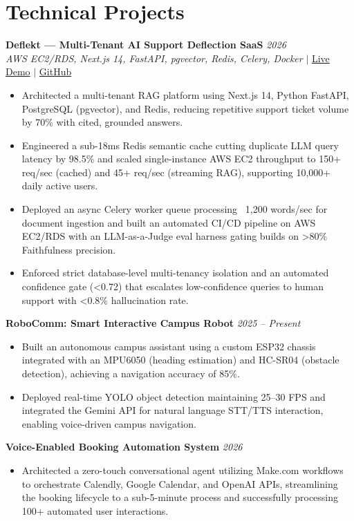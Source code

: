 \documentclass[11pt, a4paper]{article}
\begin{document}
\section*{Technical Projects}

\textbf{Deflekt — Multi-Tenant AI Support Deflection SaaS} \hfill \textit{2026} \\
\textit{AWS EC2/RDS, Next.js 14, FastAPI, pgvector, Redis, Celery, Docker} $|$ \href{http://54.208.178.218/}{Live Demo} $|$ \href{https://github.com/SShayanHussain/deflekt}{GitHub}
\begin{itemize}[leftmargin=0.25in, itemsep=2pt]
    \item Architected a multi-tenant RAG platform using Next.js 14, Python FastAPI, PostgreSQL (pgvector), and Redis, reducing repetitive support ticket volume by 70\% with cited, grounded answers.
    \item Engineered a sub-18ms Redis semantic cache cutting duplicate LLM query latency by 98.5\% and scaled single-instance AWS EC2 throughput to 150+ req/sec (cached) and 45+ req/sec (streaming RAG), supporting 10,000+ daily active users.
    \item Deployed an async Celery worker queue processing ~1,200 words/sec for document ingestion and built an automated CI/CD pipeline on AWS EC2/RDS with an LLM-as-a-Judge eval harness gating builds on >80\% Faithfulness precision.
    \item Enforced strict database-level multi-tenancy isolation and an automated confidence gate (<0.72) that escalates low-confidence queries to human support with <0.8\% hallucination rate.
\end{itemize}

\textbf{RoboComm: Smart Interactive Campus Robot} \hfill \textit{2025 -- Present}
\begin{itemize}[leftmargin=0.25in, itemsep=2pt]
    \item Built an autonomous campus assistant using a custom ESP32 chassis integrated with an MPU6050 (heading estimation) and HC-SR04 (obstacle detection), achieving a navigation accuracy of 85\%.
    \item Deployed real-time YOLO object detection maintaining 25--30 FPS and integrated the Gemini API for natural language STT/TTS interaction, enabling voice-driven campus navigation.
\end{itemize}

\textbf{Voice-Enabled Booking Automation System} \hfill \textit{2026}
\begin{itemize}[leftmargin=0.25in, itemsep=2pt]
    \item Architected a zero-touch conversational agent utilizing Make.com workflows to orchestrate Calendly, Google Calendar, and OpenAI APIs, streamlining the booking lifecycle to a sub-5-minute process and successfully processing 100+ automated user interactions.
\end{itemize}
\end{document}
